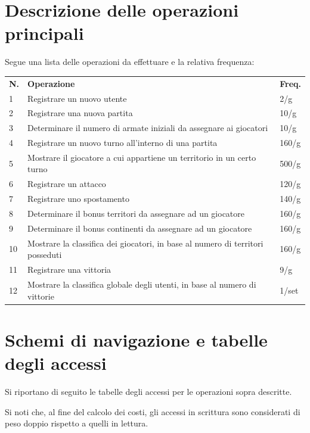 \documentclass[a4paper,12pt]{report}
\begin{document}
\section{Descrizione delle operazioni principali}

Segue una lista delle operazioni da effettuare e la relativa frequenza:

\begin{table}[htbp]
    \begin{tabular}{lll}
        \rowcolor{lime!50} 
        \textbf{N.} & \textbf{Operazione} & \textbf{Freq.} \\
        1 & Registrare un nuovo utente & 2/g \\ 
        2 & Registrare una nuova partita & 10/g \\ 
        3 & Determinare il numero di armate iniziali da assegnare ai giocatori & 10/g \\ 
        4 & Registrare un nuovo turno all'interno di una partita & 160/g \\
        5 & Mostrare il giocatore a cui appartiene un territorio in un certo turno & 500/g \\ 
        6 & Registrare un attacco & 120/g \\ 
        7 & Registrare uno spostamento & 140/g \\ 
        8 & Determinare il bonus territori da assegnare ad un giocatore & 160/g \\ 
        9 & Determinare il bonus continenti da assegnare ad un giocatore & 160/g \\ 
        10 & Mostrare la classifica dei giocatori, in base al numero di territori posseduti & 160/g \\
        11 & Registrare una vittoria & 9/g \\
        12 & Mostrare la classifica globale degli utenti, in base al numero di vittorie & 1/set \\
    \end{tabular}
\end{table}

\section{Schemi di navigazione e tabelle degli accessi}

Si riportano di seguito le tabelle degli accessi per le operazioni sopra descritte. \par
Si noti che, al fine del calcolo dei costi, gli accessi in scrittura sono considerati di peso doppio rispetto a quelli in lettura.
\end{document}
